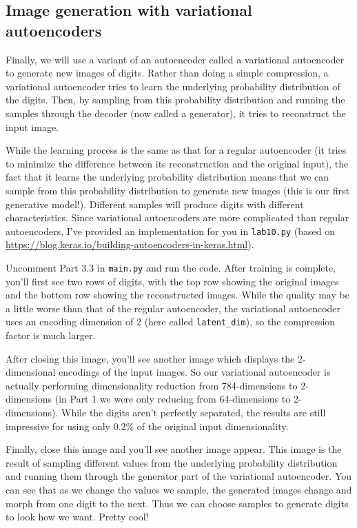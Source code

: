 \documentclass{article}
\begin{document}
\subsection{Image generation with variational autoencoders}

Finally, we will use a variant of an autoencoder called a variational autoencoder to generate new images of digits. Rather than doing a simple compression, a variational autoencoder tries to learn the underlying probability distribution of the digits. Then, by sampling from this probability distribution and running the samples through the decoder (now called a generator), it tries to reconstruct the input image.

While the learning process is the same as that for a regular autoencoder (it tries to minimize the difference between its reconstruction and the original input), the fact that it learns the underlying probability distribution means that we can sample from this probability distribution to generate new images (this is our first generative model!). Different samples will produce digits with different characteristics. Since variational autoencoders are more complicated than regular autoencoders, I've provided an implementation for you in \texttt{lab10.py} (based on \url{https://blog.keras.io/building-autoencoders-in-keras.html}).

Uncomment Part 3.3 in \texttt{main.py} and run the code. After training is complete, you'll first see two rows of digits, with the top row showing the original images and the bottom row showing the reconstructed images. While the quality may be a little worse than that of the regular autoencoder, the variational autoencoder uses an encoding dimension of 2 (here called \texttt{latent\_dim}), so the compression factor is much larger.

After closing this image, you'll see another image which displays the 2-dimensional encodings of the input images. So our variational autoencoder is actually performing dimensionality reduction from 784-dimensions to 2-dimensions (in Part 1 we were only reducing from 64-dimensions to 2-dimensions). While the digits aren't perfectly separated, the results are still impressive for using only 0.2\% of the original input dimensionality.

Finally, close this image and you'll see another image appear. This image is the result of sampling different values from the underlying probability distribution and running them through the generator part of the variational autoencoder. You can see that as we change the values we sample, the generated images change and morph from one digit to the next. Thus we can choose samples to generate digits to look how we want. Pretty cool!
\end{document}
